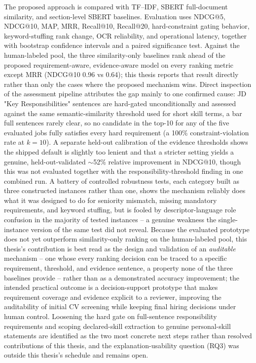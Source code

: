 \documentclass[12pt,a4paper,oneside]{report}
\begin{document}
The proposed approach is compared with TF--IDF, SBERT full-document similarity, and section-level SBERT baselines. Evaluation uses NDCG@5, NDCG@10, MAP, MRR, Recall@10, Recall@20, hard-constraint gating behavior, keyword-stuffing rank change, OCR reliability, and operational latency, together with bootstrap confidence intervals and a paired significance test. Against the human-labeled pool, the three similarity-only baselines rank ahead of the proposed requirement-aware, evidence-aware model on every ranking metric except MRR (NDCG@10 0.96 vs 0.64); this thesis reports that result directly rather than only the cases where the proposed mechanism wins. Direct inspection of the assessment pipeline attributes the gap mainly to one confirmed cause: JD "Key Responsibilities" sentences are hard-gated unconditionally and assessed against the same semantic-similarity threshold used for short skill terms, a bar full sentences rarely clear, so no candidate in the top-10 for any of the five evaluated jobs fully satisfies every hard requirement (a 100\% constraint-violation rate at $k{=}10$). A separate held-out calibration of the evidence thresholds shows the shipped default is slightly too lenient and that a stricter setting yields a genuine, held-out-validated $\sim$52\% relative improvement in NDCG@10, though this was not evaluated together with the responsibility-threshold finding in one combined run. A battery of controlled robustness tests, each category built as three constructed instances rather than one, shows the mechanism reliably does what it was designed to do for seniority mismatch, missing mandatory requirements, and keyword stuffing, but is fooled by descriptor-language role confusion in the majority of tested instances -- a genuine weakness the single-instance version of the same test did not reveal. Because the evaluated prototype does not yet outperform similarity-only ranking on the human-labeled pool, this thesis's contribution is best read as the design and validation of an \emph{auditable} mechanism -- one whose every ranking decision can be traced to a specific requirement, threshold, and evidence sentence, a property none of the three baselines provide -- rather than as a demonstrated accuracy improvement; the intended practical outcome is a decision-support prototype that makes requirement coverage and evidence explicit to a reviewer, improving the auditability of initial CV screening while keeping final hiring decisions under human control. Loosening the hard gate on full-sentence responsibility requirements and scoping declared-skill extraction to genuine personal-skill statements are identified as the two most concrete next steps rather than resolved contributions of this thesis, and the explanation-usability question (RQ3) was outside this thesis's schedule and remains open.
\end{document}
